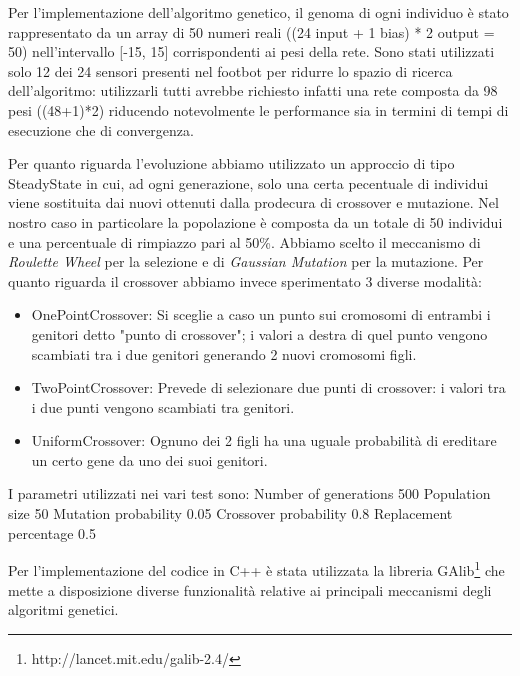\documentclass[]{report}
\begin{document}
Per l'implementazione dell'algoritmo genetico, il genoma di ogni individuo è stato rappresentato da un array di 50 numeri reali ((24 input + 1 bias) * 2  output = 50) nell'intervallo [-15, 15] corrispondenti ai pesi della rete. Sono stati utilizzati solo 12 dei 24 sensori presenti nel footbot per ridurre lo spazio di ricerca dell'algoritmo: utilizzarli tutti avrebbe richiesto infatti una rete composta da 98 pesi ((48+1)*2) riducendo notevolmente le performance sia in termini di tempi di esecuzione che di convergenza.

Per quanto riguarda l'evoluzione abbiamo utilizzato un approccio di tipo SteadyState in cui, ad ogni generazione, solo una certa pecentuale di individui viene sostituita dai nuovi ottenuti dalla prodecura di crossover e mutazione. Nel nostro caso in particolare la popolazione è composta da un totale di 50 individui e una percentuale di rimpiazzo pari al 50\%.  Abbiamo scelto il meccanismo di \textit{Roulette Wheel} per la selezione e di \textit{Gaussian Mutation} per la mutazione.
Per quanto riguarda il crossover abbiamo invece sperimentato 3 diverse modalità: 
\begin{itemize}
\item{OnePointCrossover}: Si sceglie a caso un punto sui cromosomi di entrambi i genitori detto "punto di crossover"; i valori a destra di quel punto vengono scambiati tra i due genitori generando 2 nuovi cromosomi figli.
\item{TwoPointCrossover}: Prevede di selezionare due punti di crossover: i valori tra i due punti vengono scambiati tra genitori.
\item{UniformCrossover}: Ognuno dei 2 figli ha una uguale probabilità di ereditare un certo gene da uno dei suoi genitori.
 \end{itemize}

I parametri utilizzati nei vari test sono:
Number of generations 500
Population size 50
Mutation probability 0.05
Crossover probability 0.8
Replacement percentage 0.5

Per l'implementazione del codice in C++ è stata utilizzata la libreria GAlib\footnote{http://lancet.mit.edu/galib-2.4/} che mette a disposizione diverse funzionalità relative ai principali meccanismi degli algoritmi genetici.






\end{document}
